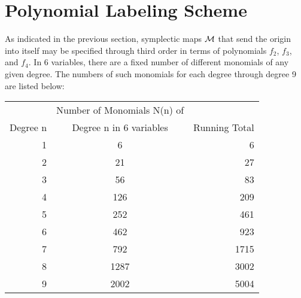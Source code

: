 \section{Polynomial Labeling Scheme}
\label{polynomial}
     As indicated in the previous section, symplectic maps ${\cal M}$ that send the
origin into itself may be specified through third order in terms of
polynomials $f_2$, $f_3$, and $f_4$.  In 6 variables, there are a fixed number of
different monomials of any given degree.  The numbers of such monomials for
each degree through degree 9 are listed below:
\begin{center}
\begin{tabular}{||r|c|r||}            \hline
    \multicolumn{1}{||c}{ } &
    \multicolumn{1}{|c|}{Number of Monomials N(n) of} &
    \multicolumn{1}{c||}{ } \\
    \multicolumn{1}{||c}{Degree n} &
    \multicolumn{1}{|c|}{Degree n in 6 variables} &
    \multicolumn{1}{r||}{Running Total} \\     \hline
        1             &             6                &              6 \\
        2             &            21                &             27 \\
        3             &            56                &             83 \\
        4             &           126                &            209 \\
        5             &           252                &            461 \\
        6             &           462                &            923 \\
        7             &           792                &           1715 \\
        8             &          1287                &           3002 \\
        9             &          2002                &           5004 \\ \hline
\end{tabular}
\end{center}

